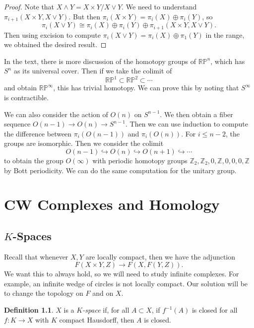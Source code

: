 \documentclass[leqno, openany]{memoir}
\theoremstyle{definition}
\newtheorem{defn}[thm]{Definition}
\theoremstyle{remark}
\theoremstyle{plain}
\theoremstyle{definition}
\theoremstyle{remark}
\newcommand{\R}{\mathbb{R}}
\newcommand{\Z}{\mathbb{Z}}
\renewcommand{\P}{\mathbb{P}}
\begin{document}
\begin{proof}
    Note that $X \wedge Y = X \times Y / X \vee Y$. We need to understand $\pi_{i+1}(X \times Y, X \vee Y)$. But then $\pi_i(X \times Y) = \pi_i(X) \oplus \pi_i(Y)$, so 
    \[ \pi_i(X \vee Y) \cong \pi_i(X) \oplus \pi_i(Y) \oplus \pi_{i+1}(X \times Y, X \vee Y). \]
    Then using excision to compute $\pi_i(X \vee Y) = \pi_i(X) \oplus \pi_1(Y)$ in the range, we obtained the desired result.
\end{proof}

In the text, there is more discussion of the homotopy groups of $\R\P^n$, which has $S^n$ as its universal cover. Then if we take the colimit of
\[ \R\P^1 \subset \R\P^2 \subset \cdots \]
and obtain $\R\P^{\infty}$, this has trivial homotopy. We can prove this by noting that $S^{\infty}$ is contractible.

We can also consider the action of $O(n)$ on $S^{n-1}$. We then obtain a fiber sequence $O(n-1) \to O(n) \to S^{n-1}$. Then we can use induction to compute the difference between $\pi_i(O(n-1))$ and $\pi_i(O(n))$. For $i \leq n-2$, the groups are isomorphic. Then we consider the colimit
\[ O(n-1) \hookrightarrow O(n) \hookrightarrow O(n+1) \hookrightarrow \cdots \]
to obtain the group $O(\infty)$ with periodic homotopy groups $\Z_2, \Z_2, 0, \Z, 0, 0, 0, \Z$ by Bott periodicity. We can do the same computation for the unitary group.

\chapter{CW Complexes and Homology}%
\label{cha:changing_spaces}

\section{$K$-Spaces}%
\label{sec:_k_spaces}

Recall that whenever $X,Y$ are locally compact, then we have the adjunction
\[ F(X \times Y, Z) \to F(X, F(Y, Z)). \]
We want this to always hold, so we will need to study infinite complexes. For example, an infinite wedge of circles is not locally compact. Our solution will be to change the topology on $F$ and on $X$.

\begin{defn}
    $X$ is a \textit{$K$-space} if, for all $A \subset X$, if $f^{-1}(A)$ is closed for all $f \colon K \to X$ with $K$ compact Hausdorff, then $A$ is closed.
\end{defn}
\end{document}
